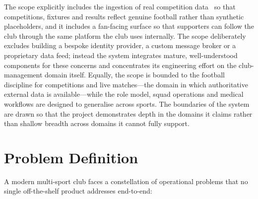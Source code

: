 The scope explicitly includes the ingestion of real competition data~\cite{footballdata} so
that competitions, fixtures and results reflect genuine football rather than synthetic
placeholders, and it includes a fan-facing surface so that supporters can follow the club
through the same platform the club uses internally. The scope deliberately excludes building
a bespoke identity provider, a custom message broker or a proprietary data feed; instead the
system integrates mature, well-understood components for these concerns and concentrates
its engineering effort on the club-management domain itself. Equally, the scope is bounded to
the football discipline for competitions and live matches---the domain in which authoritative
external data is available---while the role model, squad operations and medical workflows are
designed to generalise across sports. The boundaries of the system are drawn so that the
project demonstrates depth in the domains it claims rather than shallow breadth across
domains it cannot fully support.

\section{Problem Definition}
\label{sec:problem}

A modern multi-sport club faces a constellation of operational problems that no single
off-the-shelf product addresses end-to-end:

